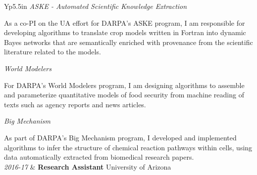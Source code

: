 \documentclass[final,oneside,11pt]{memoir}
\begin{document}
\begin{ctabular}{Yp{5.5in}}
      \emph{ASKE - Automated Scientific Knowledge Extraction}\newline

        As a co-PI on the UA effort for DARPA's ASKE program, I am responsible
        for developing algorithms to translate crop models written in Fortran into
        dynamic Bayes networks that are semantically enriched with provenance from the
        scientific literature related to the models.\newline

      \emph{World Modelers}\newline

        For DARPA's World Modelers program, I am designing algorithms to
        assemble and parameterize quantitative models of food security from machine
        reading of texts such as agency reports and news
        articles.\newline

      \emph{Big Mechanism}\newline

        As part of DARPA's Big Mechanism program, I developed and
        implemented algorithms to infer the structure of chemical reaction pathways
        within cells, using data automatically extracted from biomedical research
        papers.
  \\\addlinespace
    \textit{2016-17} & \textsf{\textbf{Research Assistant}}\hfill \textsf{ University of Arizona}\\


\end{ctabular}
\end{document}
